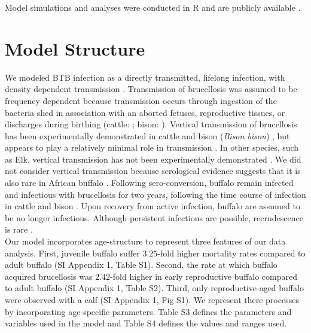 \documentclass[11pt]{article}
\begin{document}
Model simulations and analyses were conducted in R and are publicly available \cite{gorsich_git}.

\pagebreak

\section {Model Structure}
We modeled BTB infection as a directly transmitted, lifelong infection, with density dependent transmission \cite{jolles_interactions_2008}. 
Transmission of brucellosis was assumed to be frequency dependent because transmission occurs through ingestion of the bacteria shed in association with an aborted fetuses, reproductive tissues, or discharges during birthing (cattle: \cite{samartino_pathogenesis_1993}; bison: \cite{rhyan_pathogenesis_2009, rhyan_pathology_2001}). 
Vertical transmission of brucellosis has been experimentally demonstrated in cattle and bison (\textit{Bison bison}) \cite{plommet_brucellose_1973, fensterbank_congenital_1978}, but appears to play a relatively minimal role in transmission \cite{hobbs_state-space_2015}. 
In other species, such as Elk, vertical transmission has not been experimentally demonstrated \cite{thorne_brucellosis_1978}.
We did not consider vertical transmission because serological evidence suggests that it is also rare in African buffalo \cite{gorsich_context-dependent_2015}.
Following sero-conversion, buffalo remain infected and infectious with brucellosis for two years, following the time course of infection in cattle and bison \cite{rhyan_pathogenesis_2009, hobbs_state-space_2015, treanor_vaccination_2010}.  
Upon recovery from active infection, buffalo are assumed to be no longer infectious. 
Although persistent infections are possible, recrudescence is rare \cite{hobbs_state-space_2015}. \\

Our model incorporates age-structure to represent three features of our data analysis.  
First, juvenile buffalo suffer $3.25$-fold higher mortality rates compared to adult buffalo (SI Appendix 1, Table S1). 
Second, the rate at which buffalo acquired brucellosis was $2.42$-fold higher in early reproductive buffalo compared to adult buffalo (SI Appendix 1, Table S2). 
Third, only reproductive-aged buffalo were observed with a calf (SI Appendix 1, Fig S1).
We represent there processes by incorporating age-specific parameters. 
Table S3 defines the parameters and variables used in the model and Table S4 defines the values and ranges used.\\
\end{document}
